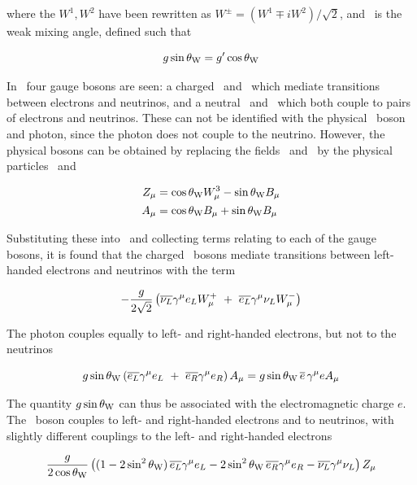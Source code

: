 where the $W^{1}, W^{2}$ have been rewritten as $W^{\pm} = (W^{1} \mp
iW^{2})/\sqrt{2}$, and \thetaW\ is the weak mixing angle, defined such that

\begin{equation}
g \sin{\ensuremath{\theta_{\mathrm{W}}}} = g' \cos{\ensuremath{\theta_{\mathrm{W}}}}
\end{equation}

In~ four gauge bosons are seen: a charged \Wp\ and
\Wm\ which mediate transitions between electrons and neutrinos, and a neutral
\Wthreemu\ and \Bmu\ which both couple to pairs of electrons and neutrinos.
These can not be identified with the physical \Z\ boson and photon, since the
photon does not couple to the neutrino.  However, the physical bosons can be obtained by replacing the fields \Wthreemu\ and \Bmu\ by the
physical particles \Zmu\ and \Amu

\begin{align}
Z_{\mu} & = \cos{\ensuremath{\theta_{\mathrm{W}}}} W^{3}_{\mu} - \sin{\ensuremath{\theta_{\mathrm{W}}}} B_{\mu} \\
A_{\mu} & = \cos{\ensuremath{\theta_{\mathrm{W}}}} B_{\mu} + \sin{\ensuremath{\theta_{\mathrm{W}}}} B_{\mu}
\end{align}

Substituting these into~ and collecting terms
relating to each of the gauge bosons, it is found that the
charged \Wpm\ bosons mediate transitions between left-handed electrons and
neutrinos with the term

\begin{equation}
- \frac{g}{2\sqrt{2}} \left( \overline{\nu_{L}} \gamma^{\mu} e_{L} W^{+}_{\mu}
\ + \  \overline{e_{L}} \gamma^{\mu} \nu_{L} W^{-}_{\mu} \right)
\end{equation}

The photon couples equally to left- and right-handed electrons, but not to the
neutrinos

\begin{equation}
g \sin{\ensuremath{\theta_{\mathrm{W}}}} \left( \overline{e_{L}} \gamma^{\mu} e_{L} 
\ + \ \overline{e_{R}} \gamma^{\mu} e_{R} \right) A_{\mu}
 = g \sin{\ensuremath{\theta_{\mathrm{W}}}} \, \overline{e}\, \gamma^{\mu} e A_{\mu}
\end{equation}

The quantity $g \sin{\ensuremath{\theta_{\mathrm{W}}}}$ can thus be associated with the electromagnetic
charge $e$. The \Z\ boson couples to left- and right-handed electrons and to
neutrinos, with slightly different couplings to the left- and right-handed
electrons

\begin{equation}
\frac{g}{2 \cos{\ensuremath{\theta_{\mathrm{W}}}}} \left( 
(1 - 2 \sin^{2}{\theta_{\mathrm{W}}})\, \overline{e_{L}} \gamma^{\mu} e_{L}  - 2 \sin^{2}{\theta_{\mathrm{W}}}\, \overline{e_{R}} \gamma^{\mu} e_{R} 
- \overline{\nu_{L}} \gamma^{\mu} \nu_{L} 
\right)Z_{\mu}
\end{equation}

